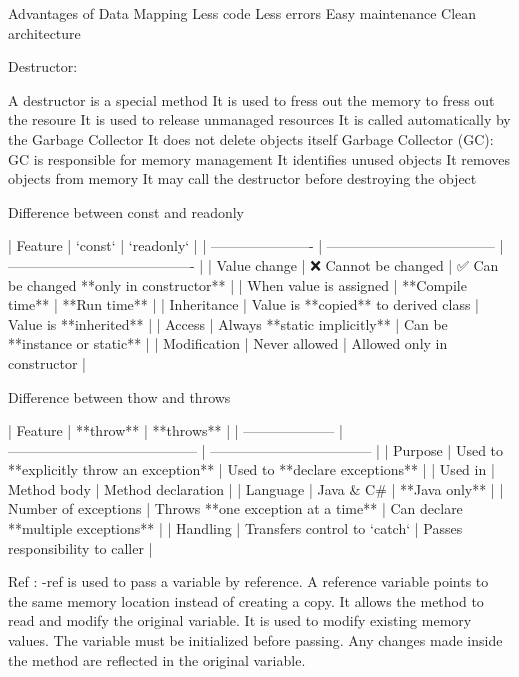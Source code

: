         Advantages of Data Mapping
        Less code
        Less errors
        Easy maintenance
        Clean architecture


Destructor:

        A destructor is a special method
        It is used to fress out the memory to fress out the resoure
        It is used to release unmanaged resources
        It is called automatically by the Garbage Collector
        It does not delete objects itself
        Garbage Collector (GC):
        GC is responsible for memory management
        It identifies unused objects
        It removes objects from memory
        It may call the destructor before destroying the object


Difference between const and readonly

| Feature                | `const`                              | `readonly`                               |
| ---------------------- | ------------------------------------ | ---------------------------------------- |
| Value change           | ❌ Cannot be changed                  | ✅ Can be changed **only in constructor** |
| When value is assigned | **Compile time**                     | **Run time**                             |
| Inheritance            | Value is **copied** to derived class | Value is **inherited**                   |
| Access                 | Always **static implicitly**         | Can be **instance or static**            |
| Modification           | Never allowed                        | Allowed only in constructor              |

Difference between thow and throws

| Feature              | **throw**                                 | **throws**                          |
| -------------------- | ----------------------------------------- | ----------------------------------- |
| Purpose              | Used to **explicitly throw an exception** | Used to **declare exceptions**      |
| Used in              | Method body                               | Method declaration                  |
| Language             | Java & C#                                 | **Java only**                       |
| Number of exceptions | Throws **one exception at a time**        | Can declare **multiple exceptions** |
| Handling             | Transfers control to `catch`              | Passes responsibility to caller     |



Ref :
        -ref is used to pass a variable by reference.
        A reference variable points to the same memory location instead of creating a copy.
        It allows the method to read and modify the original variable.
        It is used to modify existing memory values.
        The variable must be initialized before passing.
        Any changes made inside the method are reflected in the original variable.


